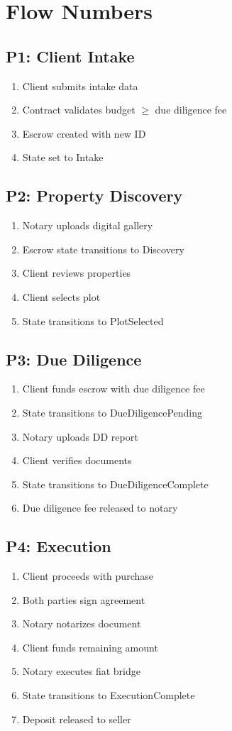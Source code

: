 \documentclass[12pt,a4paper]{article}
\begin{document}
\section{Flow Numbers}

\subsection{P1: Client Intake}
\begin{enumerate}
\item Client submits intake data
\item Contract validates budget $\ge$ due diligence fee
\item Escrow created with new ID
\item State set to Intake
\end{enumerate}

\subsection{P2: Property Discovery}
\begin{enumerate}
\item Notary uploads digital gallery
\item Escrow state transitions to Discovery
\item Client reviews properties
\item Client selects plot
\item State transitions to PlotSelected
\end{enumerate}

\subsection{P3: Due Diligence}
\begin{enumerate}
\item Client funds escrow with due diligence fee
\item State transitions to DueDiligencePending
\item Notary uploads DD report
\item Client verifies documents
\item State transitions to DueDiligenceComplete
\item Due diligence fee released to notary
\end{enumerate}

\subsection{P4: Execution}
\begin{enumerate}
\item Client proceeds with purchase
\item Both parties sign agreement
\item Notary notarizes document
\item Client funds remaining amount
\item Notary executes fiat bridge
\item State transitions to ExecutionComplete
\item Deposit released to seller
\end{enumerate}
\end{document}
